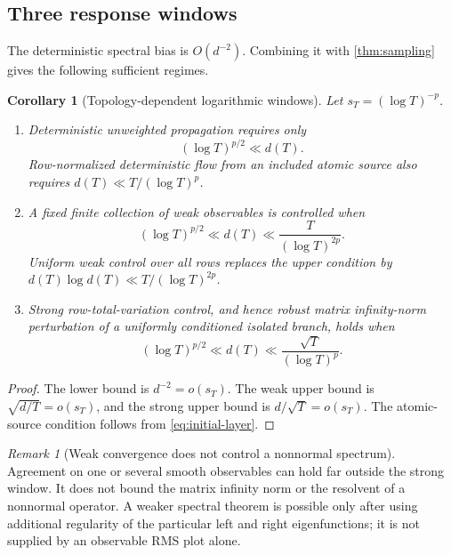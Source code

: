 \documentclass[11pt]{article}
\newtheorem{corollary}[theorem]{Corollary}
\theoremstyle{definition}
\theoremstyle{remark}
\newtheorem{remark}[theorem]{Remark}
\begin{document}
\subsection{Three response windows}

The deterministic spectral bias is $O(d^{-2})$.  Combining it with
\cref{thm:sampling} gives the following sufficient regimes.

\begin{corollary}[Topology-dependent logarithmic windows]
\label{cor:windows}
Let $s_T=(\log T)^{-p}$.
\begin{enumerate}[label=(\alph*),leftmargin=2.2em]
  \item Deterministic unweighted propagation requires only
  \begin{equation}\label{eq:det-window}
    (\log T)^{p/2}\ll d(T).
  \end{equation}
  Row-normalized deterministic flow from an included atomic source also
  requires $d(T)\ll T/(\log T)^p$.
  \item A fixed finite collection of weak observables is controlled when
  \begin{equation}\label{eq:weak-window}
    (\log T)^{p/2}\ll d(T)
    \ll\frac{T}{(\log T)^{2p}}.
  \end{equation}
  Uniform weak control over all rows replaces the upper condition by
  $d(T)\log d(T)\ll T/(\log T)^{2p}$.
  \item Strong row-total-variation control, and hence robust matrix
  infinity-norm perturbation of a uniformly conditioned isolated branch,
  holds when
  \begin{equation}\label{eq:strong-window}
    (\log T)^{p/2}\ll d(T)
    \ll\frac{\sqrt T}{(\log T)^p}.
  \end{equation}
\end{enumerate}
\end{corollary}

\begin{proof}
The lower bound is $d^{-2}=o(s_T)$.  The weak upper bound is
$\sqrt{d/T}=o(s_T)$, and the strong upper bound is
$d/\sqrt T=o(s_T)$.  The atomic-source condition follows from
\eqref{eq:initial-layer}.
\end{proof}

\begin{remark}[Weak convergence does not control a nonnormal spectrum]
\label{rem:weak-not-spectrum}
Agreement on one or several smooth observables can hold far outside the
strong window.  It does not bound the matrix infinity norm or the resolvent
of a nonnormal operator.  A weaker spectral theorem is possible only after
using additional regularity of the particular left and right eigenfunctions;
it is not supplied by an observable RMS plot alone.
\end{remark}
\end{document}
